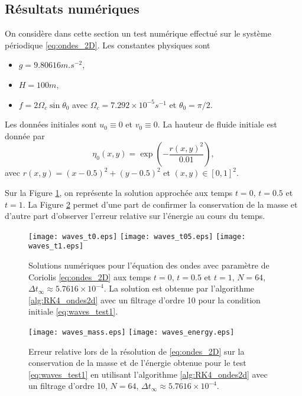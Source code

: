 \subsection{Résultats numériques}

On considère dans cette section un test numérique effectué sur le système périodique \eqref{eq:ondes_2D}. Les constantes physiques sont
\begin{itemize}
\item $g = 9.80616 \si{m.s^{-2}}$,
\item $H=100 \si{m}$,
\item $f = 2 \Omega_c \sin \theta_0$ avec $\Omega_c = 7.292 \times 10^{-5} \si{s^{-1}}$ et $\theta_0 = \pi/2$.
\end{itemize}
Les données initiales sont $u_0 \equiv 0$ et $v_0 \equiv 0$. La hauteur de fluide initiale est donnée par
\begin{equation}
\eta_0(x,y) = \exp \left( - \dfrac{r(x,y)^2}{0.01} \right),
\label{eq:waves_test1}
\end{equation}
avec $r(x,y) = (x-0.5)^2+(y-0.5)^2$ et $(x,y) \in [0,1]^2$.

Sur la Figure \ref{fig:waves_solution}, on représente la solution approchée aux temps $t=0$, $t=0.5$ et $t=1$. La Figure \ref{fig:waves_conservation} permet d'une part de confirmer la conservation de la masse et d'autre part d'observer l'erreur relative sur l'énergie au cours du temps.
\begin{figure}[htbp]
\begin{center}
\texttt{[image: waves\_t0.eps]}
\texttt{[image: waves\_t05.eps]}
\texttt{[image: waves\_t1.eps]}
\end{center}
\caption{Solutions numériques pour l'équation des ondes avec paramètre de Coriolis \eqref{eq:ondes_2D} aux temps $t=0$, $t=0.5$ et $t=1$, $N=64$, $\Delta t_{\infty} \approx 5.7616\times10^{-4}$. La solution est obtenue par l'algorithme \ref{alg:RK4_ondes2d} avec un filtrage d'ordre 10 pour la condition initiale \eqref{eq:waves_test1}.}
\label{fig:waves_solution}
\end{figure}
\begin{figure}[htbp]
\begin{center}
\texttt{[image: waves\_mass.eps]}
\texttt{[image: waves\_energy.eps]}
\end{center}
\caption{Erreur relative lors de la résolution de \eqref{eq:ondes_2D} sur la conservation de la masse et de l'énergie obtenue pour le test \eqref{eq:waves_test1} en utilisant l'algorithme \ref{alg:RK4_ondes2d} avec un filtrage d'ordre 10, $N=64$, $\Delta t_{\infty} \approx 5.7616\times10^{-4}$.}
\label{fig:waves_conservation}
\end{figure}

